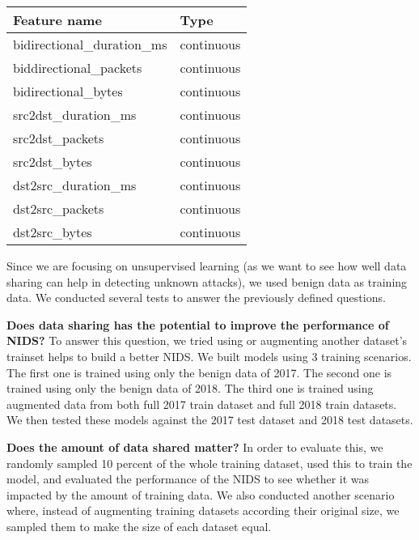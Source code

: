 \begin{method}
\begin{table}[!ht]
    \centering
    \begin{tabular}{|l|l|}
    \hline
        Feature name & Type \\ \hline
        bidirectional\_duration\_ms & continuous \\ \hline
        biddirectional\_packets & continuous \\ \hline
        bidirectional\_bytes & continuous \\ \hline
        src2dst\_duration\_ms & continuous \\ \hline
        src2dst\_packets & continuous \\ \hline
        src2dst\_bytes & continuous \\ \hline
        dst2src\_duration\_ms & continuous \\ \hline
        dst2src\_packets & continuous \\ \hline
        dst2src\_bytes & continuous \\ \hline
    \end{tabular}
\end{table}


Since we are focusing on unsupervised learning (as we want to see how well data sharing can help in detecting unknown attacks), we used benign data as training data. We conducted several tests to answer the previously defined questions.

\textbf{Does data sharing has the potential to improve the performance of NIDS?} 
To answer this question, we tried using or augmenting another dataset's trainset helps to build a better NIDS. We built models using 3 training scenarios. The first one is trained using only the benign data of 2017. The second one is trained using only the benign data of 2018. The third one is trained using augmented data from both full 2017 train dataset and full 2018 train datasets. We then tested these models against the 2017 test dataset and 2018 test datasets.

\textbf{Does the amount of data shared matter?} 
In order to evaluate this, we randomly sampled 10 percent of the whole training dataset, used this to train the model, and evaluated the performance of the NIDS to see whether it was impacted by the amount of training data. We also conducted another scenario where, instead of augmenting training datasets according their original size, we sampled them to make the size of each dataset equal. %


\end{method}
